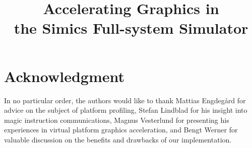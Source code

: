 \documentclass[conference, compsoc]{IEEEtran}
\begin{document}
\title{%
  Accelerating Graphics in\\
  the Simics Full-system Simulator}

\author{
  \and
  }

\maketitle








%
\IEEEpeerreviewmaketitle

\section*{Acknowledgment}
In no particular order, the authors would like to thank Mattias Engdeg{\aa}rd for advice on the subject of platform profiling, Stefan Lindblad for his insight into magic instruction communications, Magnus Vesterlund for presenting his experiences in virtual platform graphics acceleration, and Bengt Werner for valuable discussion on the benefits and drawbacks of our implementation.



\end{document}
